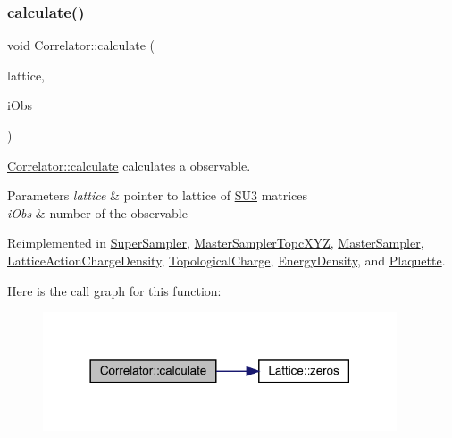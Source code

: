 \subsubsection{\texorpdfstring{calculate()}{calculate()}}
{\footnotesize\ttfamily void Correlator\+::calculate (\begin{DoxyParamCaption}\item[{\mbox{\hyperlink{class_lattice}{Lattice}}$<$ \mbox{\hyperlink{class_s_u3}{S\+U3}} $>$ $\ast$}]{lattice,  }\item[{unsigned int}]{i\+Obs }\end{DoxyParamCaption})\hspace{0.3cm}{\ttfamily [virtual]}}



\mbox{\hyperlink{class_correlator_ab33502ff305f891c5c2e6d66a26a0247}{Correlator\+::calculate}} calculates a observable. 


\begin{DoxyParams}{Parameters}
{\em lattice} & pointer to lattice of \mbox{\hyperlink{class_s_u3}{S\+U3}} matrices \\
\hline
{\em i\+Obs} & number of the observable \\
\hline
\end{DoxyParams}


Reimplemented in \mbox{\hyperlink{class_super_sampler_a7e1457583270077c4fbcb288ea9b954c}{Super\+Sampler}}, \mbox{\hyperlink{class_master_sampler_topc_x_y_z_a0ea80ad9935db791f00461b7dfd548b7}{Master\+Sampler\+Topc\+X\+YZ}}, \mbox{\hyperlink{class_master_sampler_ad3cc7e36498dbf4a39238de3ac59ae8b}{Master\+Sampler}}, \mbox{\hyperlink{class_lattice_action_charge_density_a3dddc75188042c645fbdd1c8b3e80c8a}{Lattice\+Action\+Charge\+Density}}, \mbox{\hyperlink{class_topological_charge_a8ed78c28c3484df04b1cb24187de2f5b}{Topological\+Charge}}, \mbox{\hyperlink{class_energy_density_ae8e5e29257104d881bcabeadc3b2c9e7}{Energy\+Density}}, and \mbox{\hyperlink{class_plaquette_a40cae6fd587c14836bdf61e69c615a00}{Plaquette}}.

Here is the call graph for this function\+:
\nopagebreak
\begin{figure}[H]
\begin{center}
\leavevmode
\includegraphics[width=297pt]{class_correlator_ab33502ff305f891c5c2e6d66a26a0247_cgraph}
\end{center}
\end{figure}
\mbox{\label{class_correlator_ac780d8b180294ee4801ede6e6a13f7f4}} 
